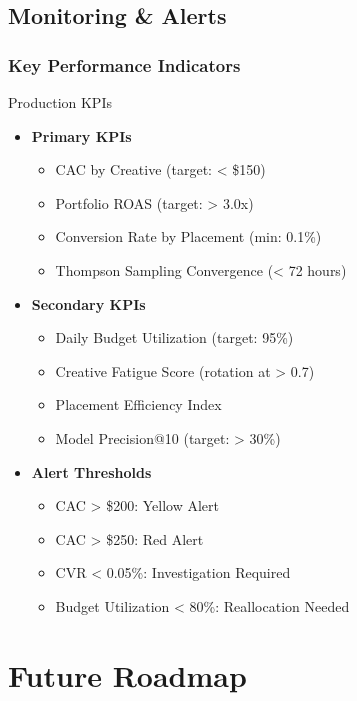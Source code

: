 \documentclass[11pt,a4paper]{report}
\begin{document}
\section{Monitoring \& Alerts}

\subsection{Key Performance Indicators}

\begin{metricbox}{Production KPIs}
\begin{itemize}
    \item \textbf{Primary KPIs}
    \begin{itemize}
        \item CAC by Creative (target: < \$150)
        \item Portfolio ROAS (target: > 3.0x)
        \item Conversion Rate by Placement (min: 0.1\%)
        \item Thompson Sampling Convergence (< 72 hours)
    \end{itemize}
    \item \textbf{Secondary KPIs}
    \begin{itemize}
        \item Daily Budget Utilization (target: 95\%)
        \item Creative Fatigue Score (rotation at > 0.7)
        \item Placement Efficiency Index
        \item Model Precision@10 (target: > 30\%)
    \end{itemize}
    \item \textbf{Alert Thresholds}
    \begin{itemize}
        \item CAC > \$200: Yellow Alert
        \item CAC > \$250: Red Alert
        \item CVR < 0.05\%: Investigation Required
        \item Budget Utilization < 80\%: Reallocation Needed
    \end{itemize}
\end{itemize}
\end{metricbox}

\chapter{Future Roadmap}
\end{document}

